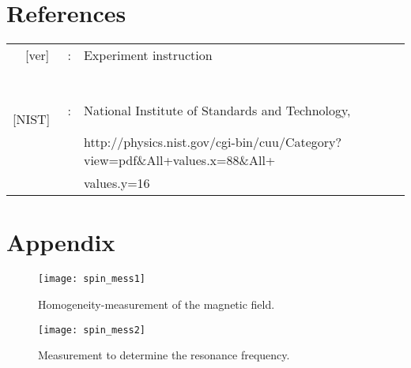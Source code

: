 \clearpage
\section{References}
\begin{tabular}{lcl}
~~[ver] & : & Experiment instruction\\~
& & \\~
[NIST] & : & National Institute of Standards and Technology,\\
 & & http://physics.nist.gov/cgi-bin/cuu/Category?view=pdf\&All+values.x=88\&All+\\
 & & values.y=16
\end{tabular}
\clearpage
\section{Appendix}
\begin{figure}[h]
\begin{center}
\texttt{[image: spin\_mess1]}
\caption{Homogeneity-measurement of the magnetic field.}
\label{fig:spin_mess1}
\end{center}
\end{figure}
\clearpage
\begin{figure}
\begin{center}
\texttt{[image: spin\_mess2]}
\caption{Measurement to determine the resonance frequency.}
\label{fig:spin_mess2}
\end{center}
\end{figure}